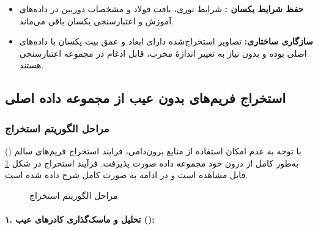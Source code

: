 \documentclass[a4paper, 10pt, twocolumn]{article}
\begin{document}
	\begin{itemize}
		\item \textbf{حفظ شرایط یکسان :} شرایط نوری، بافت فولاد و مشخصات دوربین در داده‌های آموزش و اعتبارسنجی یکسان باقی می‌ماند.
		\item \textbf{سازگاری ساختاری:} تصاویر استخراج‌شده دارای ابعاد و عمق بیت یکسان با داده‌های اصلی بوده و بدون نیاز به تغییر اندازهٔ مخرب، قابل ادغام در مجموعه اعتبارسنجی هستند.
	\end{itemize}
	
	\subsection{استخراج فریم‌های بدون عیب از مجموعه داده اصلی}
	
	\subsubsection*{مراحل الگوریتم استخراج}
	با توجه به عدم امکان استفاده از منابع برون‌دامی، فرایند استخراج فریم‌های سالم () به‌طور کامل از درون خود مجموعه داده  صورت پذیرفت. فرآیند استخراج در شکل \ref{fig:flowchart} قابل مشاهده است و در ادامه به صورت کامل شرح داده شده است.
	\begin{figure}[H]
		\centering
		\caption{مراحل الگوریتم استخراج}
		\label{fig:flowchart}
	\end{figure}
	
	\paragraph{۱. تحلیل و ماسک‌گذاری کادرهای عیب (): }
	
\end{document}
